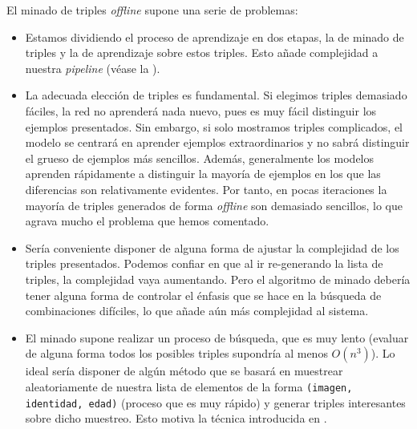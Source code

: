 El minado de triples \textit{offline} supone una serie de problemas:

\begin{itemize}
	\item Estamos dividiendo el proceso de aprendizaje en dos etapas, la de minado de triples y la de aprendizaje sobre estos triples. Esto añade complejidad a nuestra \textit{pipeline} (véase la ).
	\item La adecuada elección de triples es fundamental. Si elegimos triples demasiado fáciles, la red no aprenderá nada nuevo, pues es muy fácil distinguir los ejemplos presentados. Sin embargo, si solo mostramos triples complicados, el modelo se centrará en aprender ejemplos extraordinarios y no sabrá distinguir el grueso de ejemplos más sencillos. Además, generalmente los modelos aprenden rápidamente a distinguir la mayoría de ejemplos en los que las diferencias son relativamente evidentes. Por tanto, en pocas iteraciones la mayoría de triples generados de forma \textit{offline} son demasiado sencillos, lo que agrava mucho el problema que hemos comentado.
	\item Sería conveniente disponer de alguna forma de ajustar la complejidad de los triples presentados. Podemos confiar en que al ir re-generando la lista de triples, la complejidad vaya aumentando. Pero el algoritmo de minado debería tener alguna forma de controlar el énfasis que se hace en la búsqueda de combinaciones difíciles, lo que añade aún más complejidad al sistema.
	\item El minado supone realizar un proceso de búsqueda, que es muy lento (evaluar de alguna forma todos los posibles triples supondría al menos $O(n^3)$). Lo ideal sería disponer de algún método que se basará en muestrear aleatoriamente de nuestra lista de elementos de la forma \lstinline{(imagen, identidad, edad)} (proceso que es muy rápido) y generar triples interesantes sobre dicho muestreo. Esto motiva la técnica introducida en .
\end{itemize}
